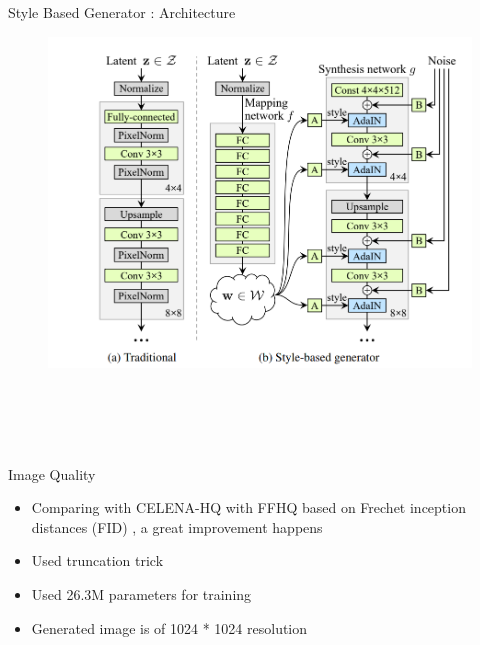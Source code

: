 \begin{frame}[fragile]{Style Based Generator : Architecture}
     \begin{figure}[ht]
         \hspace*{-1cm}\includegraphics[width=0.9\linewidth]{styleganarchitecture.png} \\ \\ \\ \\ \\
    \end{figure}
\end{frame}

\begin{frame}[fragile]{Image Quality }
        \begin{itemize}
        \item Comparing with CELENA-HQ with FFHQ based on Frechet inception distances (FID) , a great improvement happens
        \item Used truncation trick
        \item Used 26.3M parameters for training
        \item Generated image is of 1024 * 1024 resolution
    \end{itemize}

\end{frame}


